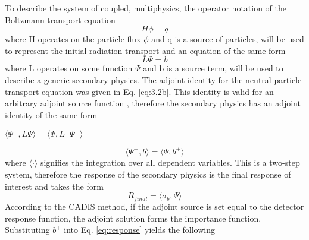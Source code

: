 To describe the system of coupled, multiphysics,
the operator notation of the Boltzmann transport equation
\begin{equation}
	H\phi = q
\end{equation}
where H operates on the particle flux $\phi$ and q is a source of particles, 
will be used to represent the initial radiation transport and 
an equation of the same form 
\begin{equation}
	L\Psi = b
\end{equation}
where L operates on some function $\Psi$ and b is a source term, will be used
to describe a generic secondary physics. 
The adjoint identity for the neutral particle transport
equation was given in Eq. \ref{eq:3.2b}.
This identity is valid for an arbitrary adjoint source function
\cite{l_m}, therefore the secondary physics has an adjoint identity of the same
form
\begin{center}
{$\langle \Psi^{+}, L\Psi \rangle = \langle \Psi, L^{+}\Psi^{+} \rangle $}
\end{center}
\begin{equation}\label{eq:adj_2_identity}
	\langle \Psi^{+}, b \rangle =
	\langle \Psi, b^{+} \rangle 
\end{equation}
where $\langle \cdot \rangle$ signifies the integration over all dependent variables.
This is a two-step system, therefore the response of the secondary physics 
is the final response of interest and takes the form
\begin{equation}\label{eq:response}
	R_{final} = \langle \sigma_b , \Psi \rangle
\end{equation}
According to the CADIS method, 
if the adjoint source is set equal to the detector response
function, the adjoint solution forms the importance function.
Substituting $b^{+}$ into Eq. \ref{eq:response} yields the following
